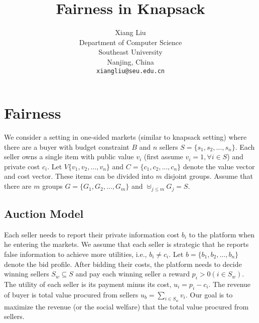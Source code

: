 \documentclass{article}
\title{Fairness in Knapsack}
\author{
  Xiang Liu \\
  Department of Computer Science\\
  Southeast University\\
  Nanjing, China\\
  \texttt{xiangliu@seu.edu.cn} 
}
\begin{document}
\maketitle

\iffalse
\begin{abstract}
\lipsum[1]
\end{abstract}
\fi

\iffalse
\keywords{First keyword \and Second keyword \and More}
\fi

\section{Fairness}
We consider a setting in one-sided markets (similar to knapsack setting) where there are a buyer with budget constraint $B$ and $n$ sellers $S=\{s_1,s_2,...,s_n\}$. Each seller owns a single item with public value $v_i$ (first assume $v_i=1,\forall{i\in S}$) and private cost $c_i$. Let $V\{v_1,v_2,...,v_n\}$ and $C=\{c_1,c_2,...,c_n\}$ denote the value vector and cost vector. These items can be divided into $m$ disjoint groups. Assume that there are $m$ groups $G=\{G_1,G_2,...,G_m\}$ and $\uplus_{j\le m}G_j=S$. 

\subsection{Auction Model}
Each seller needs to report their private information cost $b_i$ to the platform when he entering the markets. We assume that each seller is strategic that he reports false information to achieve more utilities, i.e., $b_i\neq c_i$. Let $b=\{b_1,b_2,...,b_n\}$ denote the bid profile. After bidding their costs, the platform needs to decide  winning sellers $S_w\subseteq S$ and pay each winning seller a reward $p_i>0 (i\in S_w)$. The utility of each seller is its payment minus its cost, $u_i=p_i-c_i$. The revenue of buyer is total value procured from sellers $u_b=\sum_{i\in S_w}v_i$. Our goal is to maximize the revenue (or the social welfare) that the total value procured from sellers. 
\end{document}
